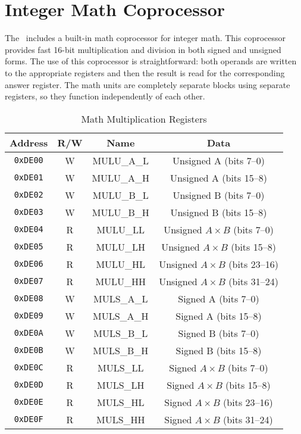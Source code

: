 \chapter{Integer Math Coprocessor}
\label{sec:int_math_copro}

The \jr\ includes a built-in math coprocessor for integer math. This coprocessor provides fast 16-bit multiplication and division in both signed and unsigned forms. The use of this coprocessor is straightforward: both operands are written to the appropriate registers and then the result is read for the corresponding answer register. The math units are completely separate blocks using separate registers, so they function independently of each other.

\begin{table}[ht]
    \begin{center}
        \begin{tabular}{|c|c|c|c|} \hline
            Address & R/W & Name & Data \\\hline\hline
            \verb+0xDE00+ & W & MULU\_A\_L & Unsigned A (bits 7--0) \\ \hline
            \verb+0xDE01+ & W & MULU\_A\_H & Unsigned A (bits 15--8) \\ \hline
            \verb+0xDE02+ & W & MULU\_B\_L & Unsigned B (bits 7--0) \\ \hline
            \verb+0xDE03+ & W & MULU\_B\_H & Unsigned B (bits 15--8) \\ \hline
            \verb+0xDE04+ & R & MULU\_LL & Unsigned $A \times B$  (bits 7--0) \\ \hline
            \verb+0xDE05+ & R & MULU\_LH & Unsigned $A \times B$  (bits 15--8) \\ \hline
            \verb+0xDE06+ & R & MULU\_HL & Unsigned $A \times B$  (bits 23--16) \\ \hline
            \verb+0xDE07+ & R & MULU\_HH & Unsigned $A \times B$  (bits 31--24) \\ \hline\hline

            \verb+0xDE08+ & W & MULS\_A\_L & Signed A (bits 7--0) \\ \hline
            \verb+0xDE09+ & W & MULS\_A\_H & Signed A (bits 15--8) \\ \hline
            \verb+0xDE0A+ & W & MULS\_B\_L & Signed B (bits 7--0) \\ \hline
            \verb+0xDE0B+ & W & MULS\_B\_H & Signed B (bits 15--8) \\ \hline
            \verb+0xDE0C+ & R & MULS\_LL & Signed $A \times B$  (bits 7--0) \\ \hline
            \verb+0xDE0D+ & R & MULS\_LH & Signed $A \times B$  (bits 15--8) \\ \hline
            \verb+0xDE0E+ & R & MULS\_HL & Signed $A \times B$  (bits 23--16) \\ \hline
            \verb+0xDE0F+ & R & MULS\_HH & Signed $A \times B$  (bits 31--24) \\ \hline
        \end{tabular}
    \end{center}
    \caption{Math Multiplication Registers}
    \label{tab:math_mult_reg}
\end{table}

